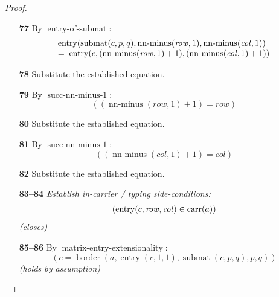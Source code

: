 \documentclass[11pt]{article}
\theoremstyle{plain}
\begin{document}
\begin{proof}
\begin{itemize}[leftmargin=2.8em, itemsep=4pt, parsep=1pt]
  \item[\textbf{77}] By $\operatorname{entry\text{-}of\text{-}submat}$:
\begin{equation*}
\begin{array}{@{}l@{}} \operatorname{entry}(\operatorname{submat}(c, p, q), \operatorname{nn\text{-}minus}(\mathit{row}, 1), \operatorname{nn\text{-}minus}(\mathit{col}, 1)) \\ =\; \operatorname{entry}(c, (\operatorname{nn\text{-}minus}(\mathit{row}, 1) + 1), (\operatorname{nn\text{-}minus}(\mathit{col}, 1) + 1)) \end{array}
\end{equation*}

  \item[\textbf{78}] Substitute the established equation.
  \item[\textbf{79}] By $\operatorname{succ\text{-}nn\text{-}minus\text{-}1}$:
\begin{equation*}
((\operatorname{nn\text{-}minus}(\mathit{row}, 1) + 1) = \mathit{row})
\end{equation*}

  \item[\textbf{80}] Substitute the established equation.
  \item[\textbf{81}] By $\operatorname{succ\text{-}nn\text{-}minus\text{-}1}$:
\begin{equation*}
((\operatorname{nn\text{-}minus}(\mathit{col}, 1) + 1) = \mathit{col})
\end{equation*}

  \item[\textbf{82}] Substitute the established equation.
  \item[\textbf{83--84}] \emph{Establish in-carrier / typing side-conditions:}
\begin{equation*}
\begin{array}{@{}l@{}}
(\operatorname{entry}(c, \mathit{row}, \mathit{col}) \in \operatorname{carr}(a))
\end{array}
\end{equation*}
  \emph{(closes)}
  \item[\textbf{85--86}] By $\operatorname{matrix\text{-}entry\text{-}extensionality}$:
\begin{equation*}
(c = \operatorname{border}(a, \operatorname{entry}(c, 1, 1), \operatorname{submat}(c, p, q), p, q))
\end{equation*}
  \emph{(holds by assumption)}
\end{itemize}
\end{proof}
\end{document}
